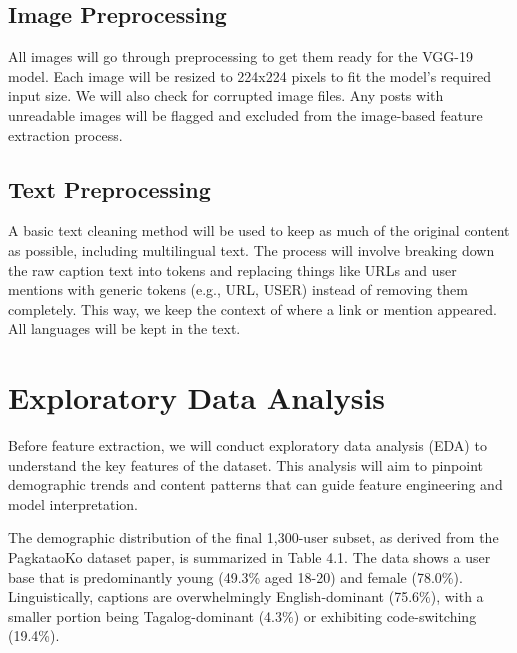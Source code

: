 \subsection{Image Preprocessing}
All images will go through preprocessing to get them ready for the VGG-19 model. Each image will be resized to 224x224 pixels to fit the model’s required input size. We will also check for corrupted image files. Any posts with unreadable images will be flagged and excluded from the image-based feature extraction process.  

\subsection{Text Preprocessing}
A basic text cleaning method will be used to keep as much of the original content as possible, including multilingual text. The process will involve breaking down the raw caption text into tokens and replacing things like URLs and user mentions with generic tokens (e.g., URL, USER) instead of removing them completely. This way, we keep the context of where a link or mention appeared. All languages will be kept in the text.


\section{Exploratory Data Analysis}
\label{subsec:eda}

Before feature extraction, we will conduct exploratory data analysis (EDA) to understand the key features of the dataset. This analysis will aim to pinpoint demographic trends and content patterns that can guide feature engineering and model interpretation.

The demographic distribution of the final 1,300-user subset, as derived from the PagkataoKo dataset paper, is summarized in Table 4.1. The data shows a user base that is predominantly young (49.3\% aged 18-20) and female (78.0\%). Linguistically, captions are overwhelmingly English-dominant (75.6\%), with a smaller portion being Tagalog-dominant (4.3\%) or exhibiting code-switching (19.4\%).


